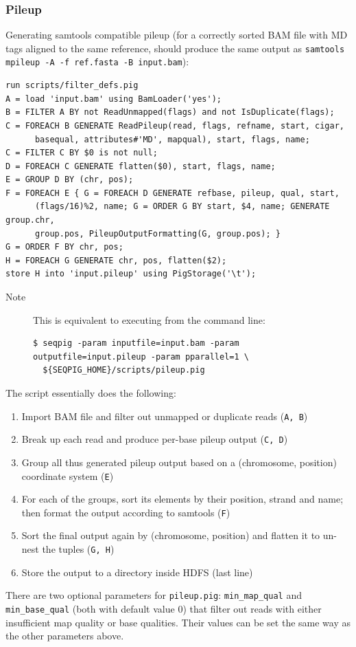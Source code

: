 \subsubsection{Pileup}
\label{subsubsect:pileup}
Generating samtools compatible pileup (for a correctly sorted BAM file
with MD tags aligned to the same reference, should produce the same output as
{\tt samtools mpileup -A -f ref.fasta -B input.bam}):
\begin{lstlisting}
run scripts/filter_defs.pig
A = load 'input.bam' using BamLoader('yes');
B = FILTER A BY not ReadUnmapped(flags) and not IsDuplicate(flags);
C = FOREACH B GENERATE ReadPileup(read, flags, refname, start, cigar,
      basequal, attributes#'MD', mapqual), start, flags, name;
C = FILTER C BY $0 is not null;
D = FOREACH C GENERATE flatten($0), start, flags, name;
E = GROUP D BY (chr, pos);
F = FOREACH E { G = FOREACH D GENERATE refbase, pileup, qual, start,
      (flags/16)%2, name; G = ORDER G BY start, $4, name; GENERATE group.chr,
      group.pos, PileupOutputFormatting(G, group.pos); }
G = ORDER F BY chr, pos;
H = FOREACH G GENERATE chr, pos, flatten($2);
store H into 'input.pileup' using PigStorage('\t');
\end{lstlisting}
\begin{description}
	\item[Note] This is equivalent to executing from the command line:
\begin{lstlisting}
$ seqpig -param inputfile=input.bam -param outputfile=input.pileup -param pparallel=1 \
  ${SEQPIG_HOME}/scripts/pileup.pig
\end{lstlisting}
\end{description}
The script essentially does the following:
\begin{enumerate}
\item Import BAM file and filter out unmapped or duplicate reads ({\tt A, B})
\item Break up each read and produce per-base pileup output ({\tt C, D})
\item Group all thus generated pileup output based on a (chromosome, position)
coordinate system ({\tt E})
\item For each of the groups, sort its elements by their position, strand and name;
then format the output according to samtools ({\tt F})
\item Sort the final output again by (chromosome, position) and flatten
it to un-nest the tuples ({\tt G, H})
\item Store the output to a directory inside HDFS (last line)
\end{enumerate}
There are two optional parameters for {\tt pileup.pig}: {\tt min\_map\_qual} and
{\tt min\_base\_qual} (both with default value 0) that filter out reads with
either insufficient map quality or base qualities. Their values can
be set the same way as the other parameters above.

